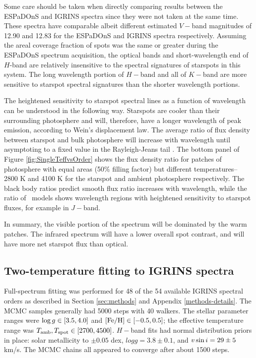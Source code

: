 \documentclass[12pt]{report}
\begin{document}
Some care should be taken when directly comparing results between the ESPaDOnS and IGRINS spectra since they were not taken at the same time.  These spectra have comparable albeit different estimated $V-$band magnitudes of 12.90 and 12.83 for the ESPaDOnS and IGRINS spectra respectively.  Assuming the areal coverage fraction of spots was the same or greater during the ESPaDOnS spectrum acquisition, the optical bands and short-wavelength end of $H$-band are relatively insensitive to the spectral signatures of starspots in this system.  The long wavelength portion of $H-$band and all of $K-$band are more sensitive to starspot spectral signatures than the shorter wavelength portions.

The heightened sensitivity to starspot spectral lines as a function of wavelength can be understood in the following way.  Starspots are cooler than their surrounding photosphere and will, therefore, have a longer wavelength of peak emission, according to Wein's displacement law.  The average ratio of flux density between starspot and bulk photosphere will increase with wavelength until asymptoting to a fixed value in the Rayleigh-Jeans tail \citep{wolk96}.  The bottom panel of Figure \ref{fig:SingleTeffvsOrder} shows the flux density ratio for patches of photosphere with equal areas (50\% filling factor) but different temperatures-- 2800 K and 4100 K for the starspot and ambient photosphere respectively.  The black body ratios predict smooth flux ratio increases with wavelength, while the ratio of \PHOENIX\ models shows wavelength regions with heightened sensitivity to starspot fluxes, for example in $J-$band.

In summary, the visible portion of the spectrum will be dominated by the warm patches.  The infrared spectrum will have a lower overall spot contrast, and will have more net starspot flux than optical.


\subsection{Two-temperature fitting to IGRINS spectra}\label{sec:two_tempIGRINS}

Full-spectrum fitting was performed for 48 of the 54 available IGRINS spectral orders as described in Section \ref{sec:methods} and Appendix \ref{methods-details}.  The MCMC samples generally had 5000 steps with 40 walkers.  The stellar parameter ranges were $\log g \in [3.5, 4.0]$ and $[{\rm Fe}/{\rm H}] \in [-0.5, 0.5]$; the effective temperature range was $T_\textrm{amb}, T_\textrm{spot} \in [2700, 4500]$.  $H-$band fits had normal distribution priors in place: solar metallicity to $\pm0.05$ dex, $logg=3.8\pm0.1$, and $v \sin i=29\pm5$ km/s.  The MCMC chains all appeared to converge after about 1500 steps.
\end{document}
